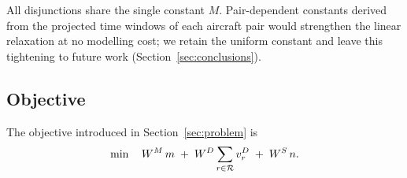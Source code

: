 All disjunctions share the single constant $M$.  Pair-dependent
constants derived from the projected time windows of each aircraft pair
would strengthen the linear relaxation at no modelling cost; we retain
the uniform constant and leave this tightening to future work
(Section~\ref{sec:conclusions}).

\subsection*{Objective}
The objective introduced in Section~\ref{sec:problem} is
\begin{equation}
  \min \quad W^M\, m
         \;+\; W^D \sum_{r \in \mathcal{R}} v^D_r
         \;+\; W^S\, n.
  \label{eq:milpobj}
\end{equation}
